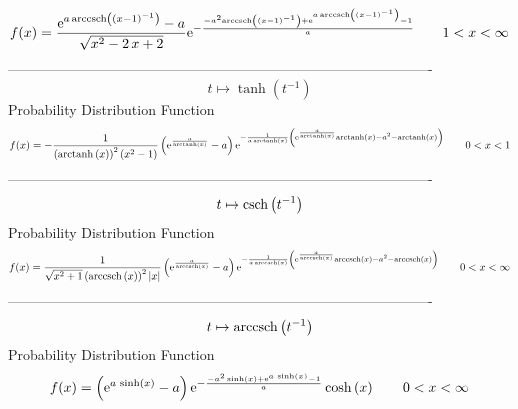 \documentclass[12pt]{article}
\begin{document}
$$  f(x)={\frac {{{\rm e}^{a\,{\rm arccsch} \left( \left( x-1 \right) ^{-1}
\right)}}-a}{\sqrt {{x}^{2}-2\,x+2}}{{\rm e}^{-{\frac {-{a}^{2}
{\rm arccsch} \left( \left( x-1 \right) ^{-1}\right)+{{\rm e}^{a\,
{\rm arccsch} \left( \left( x-1 \right) ^{-1}\right)}}-1}{a}}}}}
 \qquad1
 < x < \infty 
$$-------------------------------------------------------------------------------------------  \\$$t\mapsto \tanh \left( {t}^{-1} \right) 
$$Probability Distribution Function 
$$  f(x)=-{\frac {1}{ \left( {\rm arctanh} \left(x\right) \right) ^{2} \left( {
x}^{2}-1 \right) } \left( {{\rm e}^{{\frac {a}{{\rm arctanh} \left(x
\right)}}}}-a \right) {{\rm e}^{-{\frac {1}{a\,{\rm arctanh} \left(x
\right)} \left( {{\rm e}^{{\frac {a}{{\rm arctanh} \left(x\right)}}}}
{\rm arctanh} \left(x\right)-{a}^{2}-{\rm arctanh} \left(x\right)
 \right) }}}}
 \qquad0
 < x < 1
$$-------------------------------------------------------------------------------------------  \\$$t\mapsto {\rm csch} \left({t}^{-1}\right)
$$Probability Distribution Function 
$$  f(x)={\frac {1}{\sqrt {{x}^{2}+1} \left( {\rm arccsch} \left(x\right)
 \right) ^{2} \left| x \right| } \left( {{\rm e}^{{\frac {a}{
{\rm arccsch} \left(x\right)}}}}-a \right) {{\rm e}^{-{\frac {1}{a\,
{\rm arccsch} \left(x\right)} \left( {{\rm e}^{{\frac {a}{
{\rm arccsch} \left(x\right)}}}}{\rm arccsch} \left(x\right)-{a}^{2}-
{\rm arccsch} \left(x\right) \right) }}}}
 \qquad0
 < x < \infty 
$$-------------------------------------------------------------------------------------------  \\$$t\mapsto {\rm arccsch} \left({t}^{-1}\right)
$$Probability Distribution Function 
$$  f(x)= \left( {{\rm e}^{a\,\sinh \left( x \right) }}-a \right) {{\rm e}^{-{
\frac {-{a}^{2}\sinh \left( x \right) +{{\rm e}^{a\,\sinh \left( x
 \right) }}-1}{a}}}}\cosh \left( x \right) 
 \qquad0
 < x < \infty 
$$
\end{document}
